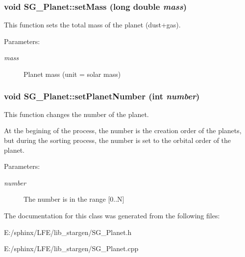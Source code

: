 \subsubsection{\setlength{\rightskip}{0pt plus 5cm}void SG\_\-Planet::set\-Mass (long double {\em mass})}\label{class_s_g___planet_a9}


This function sets the total mass of the planet (dust+gas). 

\begin{Desc}
\item[Parameters:]
\begin{description}
\item[{\em mass}]Planet mass (unit = solar mass) \end{description}
\end{Desc}
\subsubsection{\setlength{\rightskip}{0pt plus 5cm}void SG\_\-Planet::set\-Planet\-Number (int {\em number})}\label{class_s_g___planet_a13}


This function changes the number of the planet. 

At the begining of the process, the number is the creation order of the planets, but during the sorting process, the number is set to the orbital order of the planet. \begin{Desc}
\item[Parameters:]
\begin{description}
\item[{\em number}]The number is in the range [0..N] \end{description}
\end{Desc}


The documentation for this class was generated from the following files:\begin{CompactItemize}
\item 
E:/sphinx/LFE/lib\_\-stargen/SG\_\-Planet.h\item 
E:/sphinx/LFE/lib\_\-stargen/SG\_\-Planet.cpp\end{CompactItemize}
